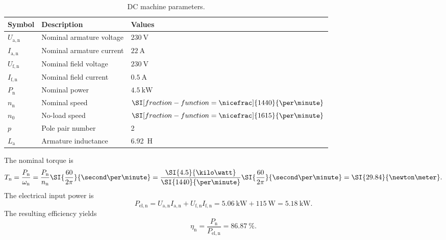 

\begin{table}[htb]
    \caption{DC machine parameters.}
    \centering
    \begin{tabular}{lll}\toprule
    Symbol  & Description       & Values \\
    \midrule
    $U_{\mathrm{a,n}}$    & Nominal armature voltage           & $\SI{230}{\volt}$ \\
    $I_{\mathrm{a,n}}$    & Nominal armature current           & $\SI{22}{\ampere}$ \\
    $U_{\mathrm{f,n}}$    & Nominal field voltage           & $\SI{230}{\volt}$ \\
    $I_{\mathrm{f,n}}$    & Nominal field current           & $\SI{0.5}{\ampere}$ \\
    $P_{\mathrm{n}}$    & Nominal power             & $\SI{4.5}{\kilo\watt}$ \\
    $n_{\mathrm{n}}$    & Nominal speed             & $\SI[fraction-function=\nicefrac]{1440}{\per\minute}$ \\
    $n_{0}$    & No-load speed             & $\SI[fraction-function=\nicefrac]{1615}{\per\minute}$ \\
    $p$     & Pole pair number              & 2 \\
    $L_\mathrm{a}$ & Armature inductance & \SI{6.92}{\henry}\\
    \bottomrule
    \end{tabular}
    \label{tab:characteristicsIM_task3}
\end{table}




\begin{solutionblock}
The nominal torque is
$$
T_\mathrm{n} = \frac{P_\mathrm{n}}{\omega_\mathrm{n}} = \frac{P_\mathrm{n}}{n_\mathrm{n}} \SI{\frac{60}{2\pi}}{\second\per\minute} = \frac{\SI{4.5}{\kilo\watt}}{\SI{1440}{\per\minute}} \SI{\frac{60}{2\pi}}{\second\per\minute} = \SI{29.84}{\newton\meter}.
$$
The electrical input power is
$$
P_\mathrm{el,n} = U_\mathrm{a,n} I_\mathrm{a,n} + U_\mathrm{f,n} I_\mathrm{f,n} = \SI{5.06}{\kilo\watt} + \SI{115}{\watt} = \SI{5.18}{\kilo\watt}.
$$
The resulting efficiency yields
$$
\eta_\mathrm{n} = \frac{P_\mathrm{n}}{P_\mathrm{el,n}} = \SI{86.87}{\percent}.
$$
\end{solutionblock}

